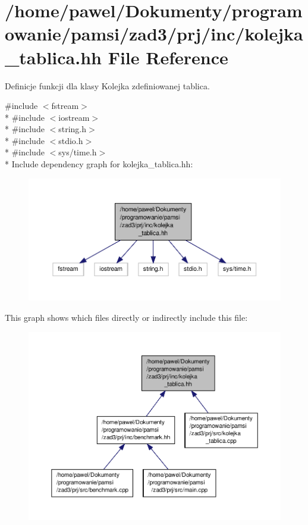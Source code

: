 \hypertarget{kolejka__tablica_8hh}{\section{/home/pawel/\-Dokumenty/programowanie/pamsi/zad3/prj/inc/kolejka\-\_\-tablica.hh File Reference}
\label{kolejka__tablica_8hh}
}


Definicje funkcji dla klasy Kolejka zdefiniowanej tablica.  


{\ttfamily \#include $<$fstream$>$}\\*
{\ttfamily \#include $<$iostream$>$}\\*
{\ttfamily \#include $<$string.\-h$>$}\\*
{\ttfamily \#include $<$stdio.\-h$>$}\\*
{\ttfamily \#include $<$sys/time.\-h$>$}\\*
Include dependency graph for kolejka\-\_\-tablica.\-hh\-:\nopagebreak
\begin{figure}[H]
\begin{center}
\leavevmode
\includegraphics[width=350pt]{kolejka__tablica_8hh__incl}
\end{center}
\end{figure}
This graph shows which files directly or indirectly include this file\-:\nopagebreak
\begin{figure}[H]
\begin{center}
\leavevmode
\includegraphics[width=350pt]{kolejka__tablica_8hh__dep__incl}
\end{center}
\end{figure}
